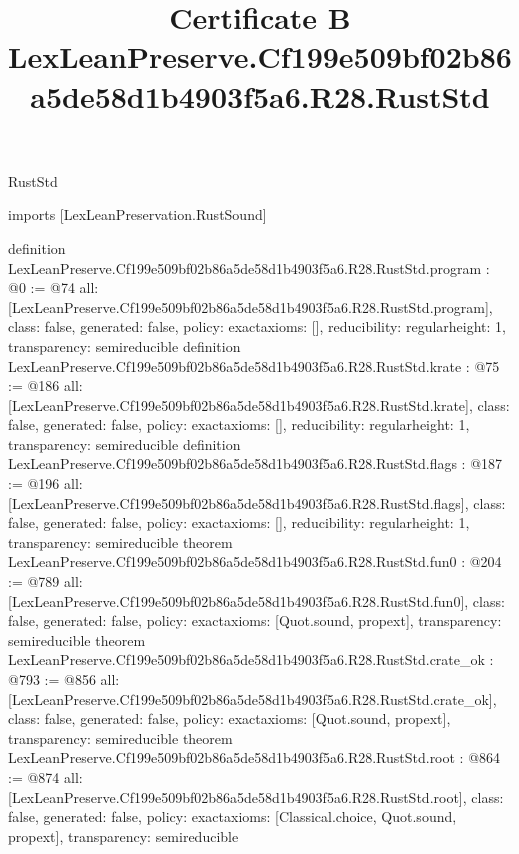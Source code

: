 \begin{lexlean}{RustStd}
\title{Certificate B LexLeanPreserve.Cf199e509bf02b86a5de58d1b4903f5a6.R28.RustStd}
\begin{coremodule}
imports [LexLeanPreservation.RustSound]

definition LexLeanPreserve.Cf199e509bf02b86a5de58d1b4903f5a6.R28.RustStd.program : @0 := @74 {
  all: [LexLeanPreserve.Cf199e509bf02b86a5de58d1b4903f5a6.R28.RustStd.program],
  class: false,
  generated: false,
  policy: exact{axioms: []},
  reducibility: regular{height: 1},
  transparency: semireducible
}
definition LexLeanPreserve.Cf199e509bf02b86a5de58d1b4903f5a6.R28.RustStd.krate : @75 := @186 {
  all: [LexLeanPreserve.Cf199e509bf02b86a5de58d1b4903f5a6.R28.RustStd.krate],
  class: false,
  generated: false,
  policy: exact{axioms: []},
  reducibility: regular{height: 1},
  transparency: semireducible
}
definition LexLeanPreserve.Cf199e509bf02b86a5de58d1b4903f5a6.R28.RustStd.flags : @187 := @196 {
  all: [LexLeanPreserve.Cf199e509bf02b86a5de58d1b4903f5a6.R28.RustStd.flags],
  class: false,
  generated: false,
  policy: exact{axioms: []},
  reducibility: regular{height: 1},
  transparency: semireducible
}
theorem LexLeanPreserve.Cf199e509bf02b86a5de58d1b4903f5a6.R28.RustStd.fun0 : @204 := @789 {
  all: [LexLeanPreserve.Cf199e509bf02b86a5de58d1b4903f5a6.R28.RustStd.fun0],
  class: false,
  generated: false,
  policy: exact{axioms: [Quot.sound, propext]},
  transparency: semireducible
}
theorem LexLeanPreserve.Cf199e509bf02b86a5de58d1b4903f5a6.R28.RustStd.crate_ok : @793 := @856 {
  all: [LexLeanPreserve.Cf199e509bf02b86a5de58d1b4903f5a6.R28.RustStd.crate_ok],
  class: false,
  generated: false,
  policy: exact{axioms: [Quot.sound, propext]},
  transparency: semireducible
}
theorem LexLeanPreserve.Cf199e509bf02b86a5de58d1b4903f5a6.R28.RustStd.root : @864 := @874 {
  all: [LexLeanPreserve.Cf199e509bf02b86a5de58d1b4903f5a6.R28.RustStd.root],
  class: false,
  generated: false,
  policy: exact{axioms: [Classical.choice, Quot.sound, propext]},
  transparency: semireducible
}


\end{coremodule}
\end{lexlean}
